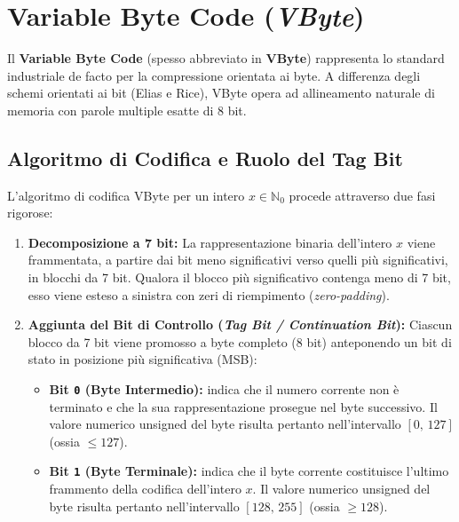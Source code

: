 \section{Variable Byte Code (\textit{VByte})}
\label{sec:vbyte}

Il \textbf{Variable Byte Code} (spesso abbreviato in \textbf{VByte}) \cite{williams1999vbyte} rappresenta lo standard industriale de facto per la compressione orientata ai byte. A differenza degli schemi orientati ai bit (Elias e Rice), VByte opera ad allineamento naturale di memoria con parole multiple esatte di 8 bit.

\FloatBarrier
\subsection{Algoritmo di Codifica e Ruolo del Tag Bit}
\label{subsec:algoritmo-vbyte}

L'algoritmo di codifica VByte per un intero $x \in \mathbb{N}_0$ procede attraverso due fasi rigorose:
\begin{enumerate}
  \item \textbf{Decomposizione a 7 bit:} La rappresentazione binaria dell'intero $x$ viene frammentata, a partire dai bit meno significativi verso quelli pi\`u significativi, in blocchi da 7 bit. Qualora il blocco pi\`u significativo contenga meno di 7 bit, esso viene esteso a sinistra con zeri di riempimento (\textit{zero-padding}).
  \item \textbf{Aggiunta del Bit di Controllo (\textit{Tag Bit / Continuation Bit}):} Ciascun blocco da 7 bit viene promosso a byte completo (8 bit) anteponendo un bit di stato in posizione pi\`u significativa (MSB):
  \begin{itemize}
    \item \textbf{Bit \texttt{0} (Byte Intermedio):} indica che il numero corrente non \`e terminato e che la sua rappresentazione prosegue nel byte successivo. Il valore numerico unsigned del byte risulta pertanto nell'intervallo $[0, \, 127]$ (ossia $\le 127$).
    \item \textbf{Bit \texttt{1} (Byte Terminale):} indica che il byte corrente costituisce l'ultimo frammento della codifica dell'intero $x$. Il valore numerico unsigned del byte risulta pertanto nell'intervallo $[128, \, 255]$ (ossia $\ge 128$).
  \end{itemize}
\end{enumerate}

